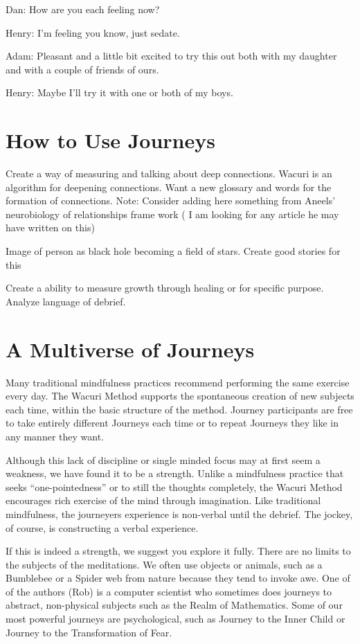 \documentclass[12pt]{book}
\begin{document}
Dan: How are you each feeling now?

Henry: I'm feeling you know, just sedate.

Adam: Pleasant and a little bit excited to try this out both with my daughter and with a couple of friends of ours.

Henry: Maybe I'll try it with one or both of my boys.

\hrulefill


\chapter{How to Use Journeys}


Create a way of measuring and talking about deep connections. Wacuri is an algorithm for deepening connections. Want a new glossary and words for the formation of connections. Note: Consider adding here something from Aneels' neurobiology of relationships frame work ( I am looking for any article he may have written on this)

Image of person as black hole becoming a field of stars. Create good stories for this

Create a ability to measure growth through healing or for specific purpose. Analyze language of debrief.


\chapter{ A Multiverse of Journeys}

Many traditional mindfulness practices recommend performing the same exercise every day. The Wacuri Method supports the spontaneous creation of new subjects each time, within the basic structure of the method. Journey participants are free to take entirely different Journeys each time or to repeat Journeys they like in any manner they want.
					
Although this lack of discipline or single minded focus may at first seem a weakness, we have found it to be a strength. Unlike a mindfulness practice that seeks “one-pointedness” or to still the thoughts completely,
the Wacuri Method encourages rich exercise of the mind through imagination.
Like traditional mindfulness, the journeyers experience is non-verbal until the debrief.
The jockey, of course, is constructing a verbal experience.
					
If this is indeed a strength, we suggest you explore it fully. There are no limits to the subjects of the meditations. We often use objects or animals, such as a Bumblebee or a Spider web from nature because they tend to invoke awe. One of of the authors (Rob) is a computer scientist who sometimes does journeys to abstract, non-physical subjects such as the Realm of Mathematics. Some of our most powerful journeys are psychological, such as Journey to the Inner Child or Journey to the Transformation of Fear.
					
\end{document}
